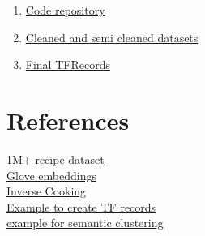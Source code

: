 \documentclass{article}
\begin{document}
\begin{enumerate}
    \item \href{https://github.com/thunderock/DeepFoodie}{Code repository}
    \item \href{https://www.kaggle.com/alphadraco/deepfoodie}{Cleaned and semi cleaned datasets}
    \item \href{https://www.kaggle.com/alphadraco/deepfoodiedataloaders}{Final TFRecords}
\end{enumerate} 

\section{References}
\href{http://pic2recipe.csail.mit.edu}{1M+ recipe dataset} \\
\href{https://nlp.stanford.edu/projects/glove/}{Glove embeddings} \\
\href{https://arxiv.org/pdf/1812.06164.pdf}{Inverse Cooking}\\
\href{https://www.kaggle.com/carloszonetgmailcom/asthma-trigger-prediction-model-trainning}{Example to create TF records} \\
\href{https://keras.io/examples/vision/semantic_image_clustering/}{example for semantic clustering} \\
\end{document}
